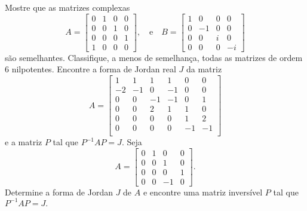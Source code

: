 \documentclass[11pt,a4paper]{article}
\begin{document}
                 \solucao{}
      Mostre que as matrizes complexas
\[
A  =\begin{bmatrix}
0 & 1 & 0 & 0\\
0 & 0 & 1 & 0 \\
0 & 0 & 0 & 1 \\
1 & 0 & 0 & 0
\end{bmatrix}, \quad \mbox{e} \quad B  =\begin{bmatrix}
1 & 0 & 0& 0\\
0 &-1 &0 & 0 \\
0 &0 & i& 0 \\
0 & 0 & 0 & -i
\end{bmatrix}
\]
são semelhantes.
                 \solucao{}
     Classifique, a menos de semelhança, todas as matrizes de ordem $6$ nilpotentes.
                 \solucao{}
     Encontre a forma de Jordan real $J$ da matriz    
 \[
 A = \begin{bmatrix}
1 & 1 & 1 & 1 & 0 & 0\\
-2 & -1 & 0 & -1 & 0 & 0\\
0 & 0 & -1 & -1 & 0 & 1\\
0 & 0 &  2 & 1 & 1 & 0\\
0 &0 & 0 & 0 & 1 & 2\\
0& 0 & 0 & 0 & -1 & -1\\
\end{bmatrix}
 \]
e a matriz $P$ tal que $P^{
-1}AP = J.$
                 \solucao{}
     Seja
\[
A  =\begin{bmatrix}
0 & 1 & 0& 0\\
0 &0 &1 & 0 \\
0 &0 &0& 1 \\
0 & 0 & -1&0
\end{bmatrix}.
\]
Determine a forma de Jordan $J$ de $A$ e encontre uma matriz inversível $P$ tal que $P^{-1}AP = J.$
\end{document}
